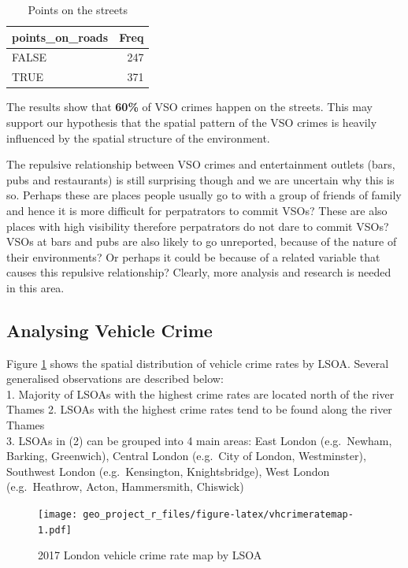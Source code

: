 \documentclass[]{article}
\theoremstyle{definition}
\theoremstyle{definition}
\theoremstyle{definition}
\theoremstyle{remark}
\begin{document}
\begin{table}

\caption{\label{tab:COL001F-roads-intersect}Points on the streets}
\centering
\begin{tabular}[t]{l|r}
\hline
points\_on\_roads & Freq\\
\hline
FALSE & 247\\
\hline
TRUE & 371\\
\hline
\end{tabular}
\end{table}

The results show that \textbf{60\%} of VSO crimes happen on the streets.
This may support our hypothesis that the spatial pattern of the VSO
crimes is heavily influenced by the spatial structure of the
environment.

The repulsive relationship between VSO crimes and entertainment outlets
(bars, pubs and restaurants) is still surprising though and we are
uncertain why this is so. Perhaps these are places people usually go to
with a group of friends of family and hence it is more difficult for
perpatrators to commit VSOs? These are also places with high visibility
therefore perpatrators do not dare to commit VSOs? VSOs at bars and pubs
are also likely to go unreported, because of the nature of their
environments? Or perhaps it could be because of a related variable that
causes this repulsive relationship? Clearly, more analysis and research
is needed in this area.

\hypertarget{htmlwidget-0c1675809333a60c367a}{}

\subsection{Analysing Vehicle Crime}\label{analysing-vehicle-crime}

Figure \ref{fig:vhcrimeratemap} shows the spatial distribution of
vehicle crime rates by LSOA. Several generalised observations are
described below:\\
1. Majority of LSOAs with the highest crime rates are located north of
the river Thames 2. LSOAs with the highest crime rates tend to be found
along the river Thames\\
3. LSOAs in (2) can be grouped into 4 main areas: East London
(e.g.~Newham, Barking, Greenwich), Central London (e.g.~City of London,
Westminster), Southwest London (e.g.~Kensington, Knightsbridge), West
London (e.g.~Heathrow, Acton, Hammersmith, Chiswick)

\begin{figure}
\centering
\texttt{[image: geo\_project\_r\_files/figure-latex/vhcrimeratemap-1.pdf]}
\caption{\label{fig:vhcrimeratemap}2017 London vehicle crime rate map by
LSOA}
\end{figure}
\end{document}
